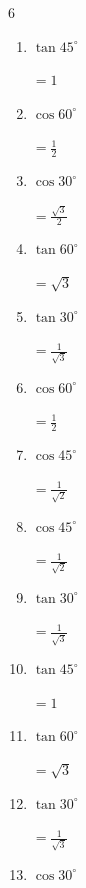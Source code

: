 \begin{multicols}{6}
\begin{enumerate}
        $\displaystyle =\sqrt{3}$

  \item $\displaystyle \tan{45^\circ}$

        $\displaystyle =1$

  \item $\displaystyle \cos{60^\circ}$

        $\displaystyle =\frac{1}{2}$

  \item $\displaystyle \cos{30^\circ}$

        $\displaystyle =\frac{\sqrt{3}}{2}$

  \item $\displaystyle \tan{60^\circ}$

        $\displaystyle =\sqrt{3}$

  \item $\displaystyle \tan{30^\circ}$

        $\displaystyle =\frac{1}{\sqrt{3}}$

\columnbreak %

  \item $\displaystyle \cos{60^\circ}$

        $\displaystyle =\frac{1}{2}$

  \item $\displaystyle \cos{45^\circ}$

        $\displaystyle =\frac{1}{\sqrt{2}}$

  \item $\displaystyle \cos{45^\circ}$

        $\displaystyle =\frac{1}{\sqrt{2}}$

  \item $\displaystyle \tan{30^\circ}$

        $\displaystyle =\frac{1}{\sqrt{3}}$

  \item $\displaystyle \tan{45^\circ}$

        $\displaystyle =1$

  \item $\displaystyle \tan{60^\circ}$

        $\displaystyle =\sqrt{3}$

  \item $\displaystyle \tan{30^\circ}$

        $\displaystyle =\frac{1}{\sqrt{3}}$

  \item $\displaystyle \cos{30^\circ}$


\end{enumerate}
\end{multicols}
